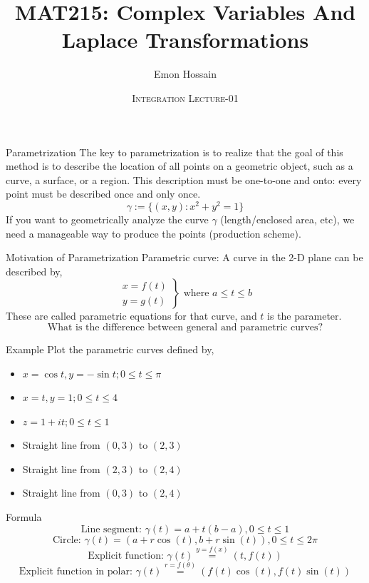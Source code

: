 \documentclass[11pt]{beamer}
\author[] %
{Emon Hossain\inst{1}}
\institute[University of Dhaka] %
{
  \inst{1}%
  Lecturer\\MNS department\\Brac University
}
\date[] %
{\textsc{Integration Lecture-01}}
\title[]{MAT215: Complex Variables And Laplace Transformations}
\theoremstyle{plain}
\begin{document}
\begin{frame}
\titlepage
\end{frame}

\begin{frame}{Parametrization}
    The key to parametrization is to realize that the goal of this method is to describe the location of all points on a geometric object, such as a curve, a surface, or a region. This description must be one-to-one and onto: every point must be described once and only once.
    $$\gamma:=\{(x,y): x^2+y^2=1\}$$
If you want to geometrically analyze the curve $\gamma$ (length/enclosed area, etc), we need a manageable way to produce the points (production scheme). 
\end{frame}

\begin{frame}{Motivation of Parametrization}
    Parametric curve: A curve in the 2-D plane can be described by,
$$
\left.\begin{array}{l}
x=f(t) \\
y=g(t)
\end{array}\right\} \text { where } a \leqslant t \leqslant b
$$
These are called parametric equations for that curve, and $t$ is the parameter. 
$$\boxed{\text{What is the difference between general and parametric curves?}}$$
\end{frame}

\begin{frame}{Example}
Plot the parametric curves defined by,
\begin{itemize}
    \item $x=\cos t, y=-\sin t ; 0 \leq t \leq \pi$
    \item $x=t, y=1 ; 0 \leq t \leq 4$
    \item $z=1+i t ; 0 \leq t \leq 1$ 
    \item Straight line from $(0,3)$ to $(2,3)$
    \item Straight line from $(2,3)$ to $(2,4)$
    \item Straight line from $(0,3)$ to $(2,4)$
\end{itemize}
\end{frame}

\begin{frame}{Formula}
    $$\boxed{\text{Line segment: }\gamma(t)= a+t(b-a), 0\leq t\leq 1}$$
    $$\boxed{\text{Circle: }\gamma(t)=(a+r\cos(t),b+r\sin(t)) , 0\leq t\leq 2\pi}$$
    $$\boxed{\text{Explicit function: }\gamma(t)\stackrel{y=f(x)}{=}(t,f(t))}$$
    $$\boxed{\text{Explicit function in polar: }\gamma(t)\stackrel{r=f(\theta)}{=}(f(t)\cos(t),f(t)\sin(t))}$$
\end{frame}
\end{document}
